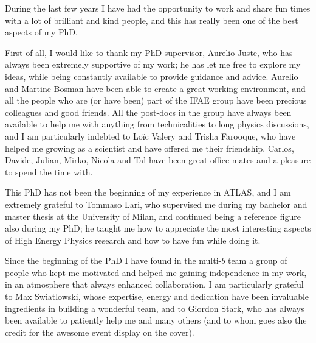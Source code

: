 \par\bigskip  
\par\bigskip

During the last few years I have had the opportunity to work and share fun times with a lot 
of brilliant and kind people, and this has really been one of the best aspects of my PhD. 

\par\medskip 

First of all, I would like to thank my PhD supervisor, Aurelio Juste, who has always been 
extremely supportive of my work; 
he has let me free to explore my ideas, while being constantly available to provide guidance and advice. 
Aurelio and Martine Bosman have been able to create a great working environment, and 
all the people who are (or have been) part of the IFAE group have been precious colleagues and 
good friends.  
All the post-docs in the group have always been available to help me with 
anything from technicalities to long physics discussions, 
and I am particularly indebted to Lo\"ic Valery and Trisha Farooque, who have helped me growing as a scientist and have offered me 
their friendship. 
Carlos, Davide, Julian, Mirko, Nicola and Tal have been great office mates 
and a pleasure to spend the time with. 
 
\par\medskip 

This PhD has not been the beginning of my experience in ATLAS, and I am extremely grateful to 
Tommaso Lari, who supervised me during my bachelor and master thesis at the University of Milan, 
and continued being a reference figure also during my PhD; 
he taught me how to appreciate the most interesting aspects of High Energy Physics research 
and how to have fun while doing it.   

\par\medskip 

Since the beginning of the PhD I have found in the multi-$b$ team a 
group of people who kept me motivated and helped me 
gaining independence in my work, 
in an atmosphere that always enhanced collaboration. %
I am particularly grateful to Max Swiatlowski, whose expertise, energy and dedication have been 
invaluable ingredients in building a wonderful team, 
and to Giordon Stark, who has always been available to patiently help me and many others (and 
to whom goes also the credit for the awesome event display on the cover). 


